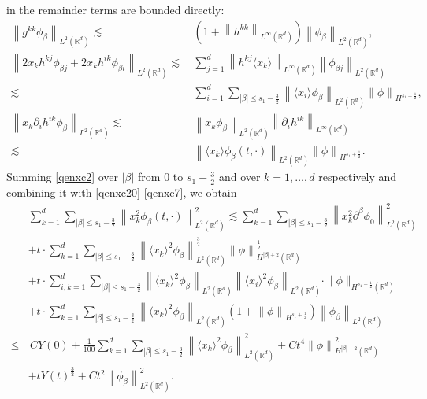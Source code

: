 \documentclass[10pt,twoside,a4paper]{article}
\numberwithin{equation}{section}\allowdisplaybreaks
\def\leq{\leqslant}
\begin{document}
in the remainder terms  are bounded directly:
\begin{align}
	\left\|  g^{kk} \phi_{\beta }  \right\|_{L^2(\mathbb{R}^d)}\lesssim &\, \left(1+\left\|   h^{kk}    \right\|_{L^\infty(\mathbb{R}^d)}\right) 	\left\|    \phi_{\beta }  \right\|_{L^2(\mathbb{R}^d)} , \label{qenxc5}\\
	\left\|    2 x_k h^{kj} \phi_{\beta j}+2 x_k h^{ik} \phi_{\beta i}    \right\|_{L^2(\mathbb{R}^d)}
	\lesssim &\,\sum_{j=1}^d \left\|   h^{kj}  \langle x_k\rangle \right\|_{L^\infty(\mathbb{R}^d)} \left\|    \phi_{\beta j}    \right\|_{L^2(\mathbb{R}^d)} \label{qenxc6}\\
	\lesssim &\,\sum_{i=1}^d\sum_{|\beta| \leq s_1-\frac 32}\left\| \langle x_i\rangle \phi_{\beta}\right\|_{L^2(\mathbb{R}^d)} \left\| \phi\right\|_{H^{s_1+\frac 12}},\nonumber\\
	\left\|     x_k \partial_i h^{ik} \phi_{\beta }   \right\|_{L^2(\mathbb{R}^d)} \lesssim &\,\left\|     x_k   \phi_{\beta }   \right\|_{L^2(\mathbb{R}^d)}\left\|      \partial_i h^{ik}    \right\|_{L^\infty(\mathbb{R}^d)}\label{qenxc7}\\
	\lesssim &\,    \left\|    \langle x_k \rangle  \phi_{\beta}\left(t,\cdot\right)\right\|_{L^2(\mathbb{R}^d)}  \left\| \phi\right\|_{H^{s_1+\frac 12}}.\nonumber
\end{align}
Summing \eqref{qenxc2} over $ |\beta| $ from $ 0 $ to $ s_1-\frac 32 $ and over $ k =1,\dots,  d $ respectively and combining  it with \eqref{qenxc20}-\eqref{qenxc7}, we obtain
\begin{align} \label{qenx2}
		& \sum_{k=1}^d\sum_{|\beta| \leq s_1-\frac32}\left\|  x_k^2 \phi_{\beta}\left(t,\cdot\right)\right\|_{L^2(\mathbb{R}^d)}^2  \lesssim \sum_{k=1}^d \sum_{|\beta| \leq s_1-\frac32}  \left\|  x_k^2 \partial^{\beta}\phi_0\right\|_{L^2(\mathbb{R}^d)}^2  \nonumber\\
		&+t \cdot  \sum_{k=1}^d \sum_{|\beta| \leq s_1-\frac32}  \left\|  \langle x_k\rangle^2 \phi_{\beta}\right\|_{L^2(\mathbb{R}^d)}^{\frac 32}  \left\|  \phi\right\|_{H^{|\beta|+2}(\mathbb{R}^d)}^{\frac 12}\nonumber\\
		&+t \cdot  	\sum_{i,k=1}^d\sum_{|\beta| \leq s_1-\frac32}\left\| \langle x_k\rangle^2 \phi_{\beta}\right\|_{L^2(\mathbb{R}^d)}\left\| \langle x_i\rangle^2 \phi_{\beta}\right\|_{L^2(\mathbb{R}^d)} \cdot \|\phi\|_{H^{s_1+\frac 12}(\mathbb{R}^{d})}  \nonumber\\
	&+t\cdot \sum_{k=1}^d  \sum_{|\beta| \leq s_1-\frac32}\left\| \langle x_k\rangle^2 \phi_{\beta}\right\|_{L^2(\mathbb{R}^d)}\left(1+ \left\| \phi\right\|_{H^{s_1+\frac 12}} \right) 	\left\|    \phi_{\beta }  \right\|_{L^2(\mathbb{R}^d)}  	\nonumber\\
	\leq &\, C Y(0)+ \frac {1}{100} \sum_{k=1}^d \sum_{|\beta| \leq s_1-\frac32}  \left\|  \langle x_k\rangle^2 \phi_{\beta}\right\|_{L^2(\mathbb{R}^d)}^{2}   +Ct^4 \left\|  \phi\right\|_{H^{|\beta|+2}(\mathbb{R}^d)} ^2 \\
	&+ tY(t)^{\frac 32}+Ct^2 \left\| \phi_{\beta}\right\|_{L^2(\mathbb{R}^d)}^2. \nonumber
\end{align}
\end{document}
